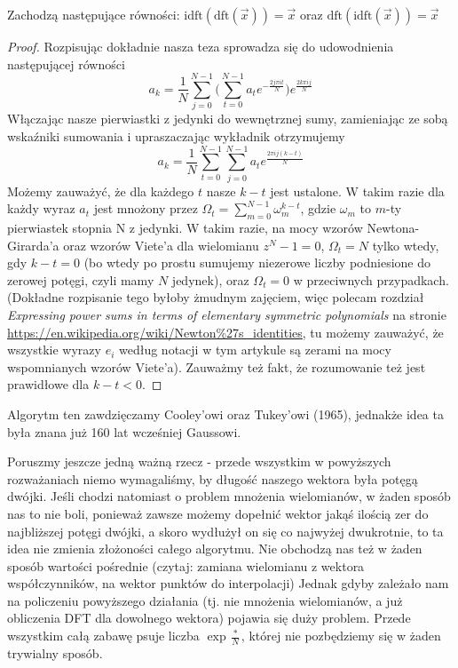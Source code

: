 \begin{observation_small}
    Zachodzą następujące równości: $\text{idft}(\text{dft}(\vec{x})) = \vec{x}$ oraz $\text{dft}(\text{idft}(\vec{x})) = \vec{x}$
\end{observation_small}
\begin{proof}
    Rozpisując dokładnie nasza teza sprowadza się do udowodnienia następującej równości $$a_k = \frac{1}{N}\sum_{j=0}^{N-1}\Big(\sum_{t=0}^{N-1} a_t e^{-\frac{2j\pi i t}{N}} \Big) e^{\frac{2k\pi i j}{N}}$$
    Włączając nasze pierwiastki z jedynki do wewnętrznej sumy, zamieniając ze sobą wskaźniki sumowania i upraszaczając wykładnik otrzymujemy
    $$a_k = \frac{1}{N}\sum_{t=0}^{N-1}\sum_{j=0}^{N-1} a_t e^{\frac{2\pi i j(k-t)}{N}}$$
    Możemy zauważyć, że dla każdego $t$ nasze $k-t$ jest ustalone. W takim razie dla każdy wyraz $a_t$ jest mnożony przez $\Omega_t = \sum_{m=0}^{N-1}\omega_m^{k-t}$, gdzie $\omega_m$ to $m$-ty pierwiastek stopnia N z jedynki.
    W takim razie, na mocy wzorów Newtona-Girarda'a oraz wzorów Viete'a dla wielomianu $z^N - 1 = 0$, $\Omega_t = N$ tylko wtedy, gdy $k-t = 0$ (bo wtedy po prostu sumujemy niezerowe liczby podniesione do zerowej potęgi, czyli mamy $N$ jedynek), oraz $\Omega_t = 0$ w przeciwnych przypadkach.
    (Dokładne rozpisanie tego byłoby żmudnym zajęciem, więc polecam rozdział \textit{Expressing power sums in terms of elementary symmetric polynomials} na stronie \url{https://en.wikipedia.org/wiki/Newton%27s_identities},
    tu możemy zauważyć, że wszystkie wyrazy $e_i$ według notacji w tym artykule są zerami na mocy wspomnianych wzorów Viete'a).
    Zauważmy też fakt, że rozumowanie też jest prawidłowe dla $k-t < 0$.
\end{proof}
Algorytm ten zawdzięczamy Cooley'owi oraz Tukey'owi (1965), jednakże idea ta była znana już 160 lat wcześniej Gaussowi.

Poruszmy jeszcze jedną ważną rzecz - przede wszystkim w powyższych rozważaniach niemo wymagaliśmy, by długość naszego wektora była potęgą dwójki.
Jeśli chodzi natomiast o problem mnożenia wielomianów, w żaden sposób nas to nie boli, ponieważ zawsze możemy dopełnić wektor jakąś ilością zer do najbliższej potęgi dwójki,
a skoro wydłużył on się co najwyżej dwukrotnie, to ta idea nie zmienia złożoności całego algorytmu.
Nie obchodzą nas też w żaden sposób wartości pośrednie (czytaj: zamiana wielomianu z wektora współczynników, na wektor punktów do interpolacji)
Jednak gdyby zależało nam na policzeniu powyższego działania (tj. nie mnożenia wielomianów, a już obliczenia DFT dla dowolnego wektora) pojawia się duży problem.
Przede wszystkim całą zabawę psuje liczba $\exp{\frac{*}{N}}$, której nie pozbędziemy się w żaden trywialny sposób.

